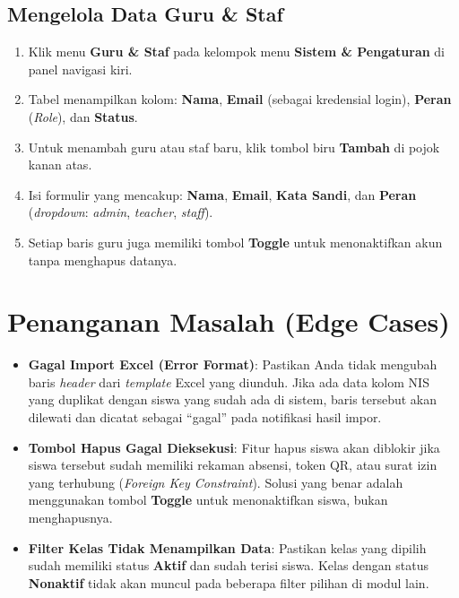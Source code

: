 \subsection{Mengelola Data Guru \& Staf}
\begin{enumerate}
    \item Klik menu \textbf{Guru \& Staf} pada kelompok menu \textbf{Sistem \& Pengaturan} di panel navigasi kiri.
    \item Tabel menampilkan kolom: \textbf{Nama}, \textbf{Email} (sebagai kredensial login), \textbf{Peran} (\textit{Role}), dan \textbf{Status}.
    \item Untuk menambah guru atau staf baru, klik tombol biru \textbf{Tambah} di pojok kanan atas.
    \item Isi formulir yang mencakup: \textbf{Nama}, \textbf{Email}, \textbf{Kata Sandi}, dan \textbf{Peran} (\textit{dropdown}: \textit{admin}, \textit{teacher}, \textit{staff}).
    \item Setiap baris guru juga memiliki tombol \textbf{Toggle} untuk menonaktifkan akun tanpa menghapus datanya.
\end{enumerate}

\section{Penanganan Masalah (Edge Cases)}
\begin{itemize}
    \item \textbf{Gagal Import Excel (Error Format)}: Pastikan Anda tidak mengubah baris \textit{header} dari \textit{template} Excel yang diunduh. Jika ada data kolom NIS yang duplikat dengan siswa yang sudah ada di sistem, baris tersebut akan dilewati dan dicatat sebagai ``gagal'' pada notifikasi hasil impor.
    \item \textbf{Tombol Hapus Gagal Dieksekusi}: Fitur hapus siswa akan diblokir jika siswa tersebut sudah memiliki rekaman absensi, token QR, atau surat izin yang terhubung (\textit{Foreign Key Constraint}). Solusi yang benar adalah menggunakan tombol \textbf{Toggle} untuk menonaktifkan siswa, bukan menghapusnya.
    \item \textbf{Filter Kelas Tidak Menampilkan Data}: Pastikan kelas yang dipilih sudah memiliki status \textbf{Aktif} dan sudah terisi siswa. Kelas dengan status \textbf{Nonaktif} tidak akan muncul pada beberapa filter pilihan di modul lain.
\end{itemize}
